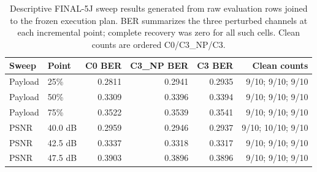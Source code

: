 \begin{table}[t]
\centering
\caption{Descriptive FINAL-5J sweep results generated from raw evaluation rows joined to the frozen execution plan. BER summarizes the three perturbed channels at each incremental point; complete recovery was zero for all such cells. Clean counts are ordered C0/C3\_NP/C3.}
\label{tab:5j-sweeps}
\begingroup\scriptsize\setlength{\tabcolsep}{4pt}
\begin{tabular}{llrrrr}
\toprule
Sweep & Point & C0 BER & C3\_NP BER & C3 BER & Clean counts \\
\midrule
Payload & 25\% & 0.2811 & 0.2941 & 0.2935 & 9/10; 9/10; 9/10 \\
Payload & 50\% & 0.3309 & 0.3396 & 0.3394 & 9/10; 9/10; 9/10 \\
Payload & 75\% & 0.3522 & 0.3539 & 0.3541 & 9/10; 9/10; 9/10 \\
\midrule
PSNR & 40.0 dB & 0.2959 & 0.2946 & 0.2937 & 9/10; 10/10; 9/10 \\
PSNR & 42.5 dB & 0.3337 & 0.3318 & 0.3317 & 9/10; 9/10; 9/10 \\
PSNR & 47.5 dB & 0.3903 & 0.3896 & 0.3896 & 9/10; 9/10; 9/10 \\
\bottomrule
\end{tabular}
\endgroup
\end{table}
